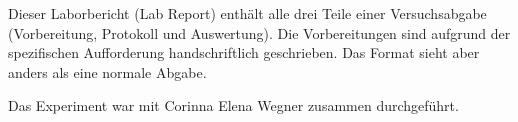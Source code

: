 Dieser Laborbericht (Lab Report) enthält alle drei Teile einer Versuchsabgabe (Vorbereitung, Protokoll und Auswertung). Die Vorbereitungen sind aufgrund der spezifischen Aufforderung handschriftlich geschrieben. Das Format sieht aber anders als eine normale Abgabe.

Das Experiment war mit Corinna Elena Wegner zusammen durchgeführt. 